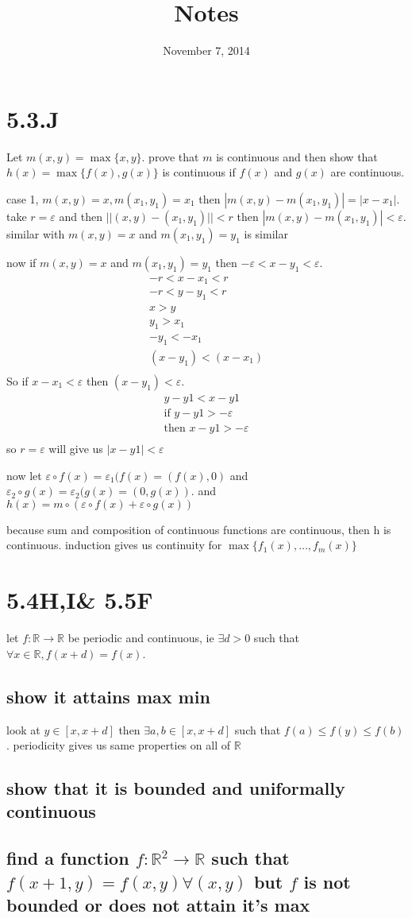 \documentclass[letterpaper]{article}
\begin{document}
\title{Notes}
\date{November 7, 2014}
\maketitle
\section*{5.3.J}
Let $m(x,y)=\max\{x,y\}$. prove that $m$ is continuous and then show that $h(x)=\max\{f(x),g(x)\}$ is continuous if $f(x)$ and $g(x)$ are continuous.

case 1, $m(x,y)=x,m(x_1,y_1)=x_1$ then $|m(x,y)-m(x_1,y_1)|=|x-x_1|$. take $r=\varepsilon$ and then $||(x,y)-(x_1,y_1)||<r$ then $|m(x,y)-m(x_1,y_1)|<\varepsilon$. similar with $m(x,y)=x$ and $m(x_1,y_1)=y_1$ is similar

now if $m(x,y)=x$ and $m(x_1,y_1)=y_1$ then $-\varepsilon<x-y_1<\varepsilon$.
\begin{align*}
  -r<x-x_1<r\\
  -r<y-y_1<r\\
  x>y\\
  y_1>x_1\\
  -y_1<-x_1\\
  (x-y_1)<(x-x_1)\\
\end{align*}
So if $x-x_1<\varepsilon$ then $(x-y_1)<\varepsilon$. 
\begin{align*}
  y-y1<x-y1\\
  \text{if }y-y1>-\varepsilon\\
  \text{then }x-y1>-\varepsilon\\
\end{align*}
so $r=\varepsilon$ will give us $|x-y1|<\varepsilon$

now let $\varepsilon\circ f(x)=\varepsilon_1(f(x)=(f(x),0)$ and $\varepsilon_2\circ g(x)=\varepsilon_2(g(x)=(0,g(x))$. and $h(x)=m\circ(\varepsilon\circ f(x)+\varepsilon\circ g(x))$

because sum and composition of continuous functions are continuous, then h is continuous. induction gives us continuity for $\max\{f_1(x),\dots,f_m(x)\}$

\section*{5.4H,I\& 5.5F}
let $f:\mathbb{R}\to\mathbb{R}$ be periodic and continuous, ie $\exists d>0$ such that $\forall x\in \mathbb{R}, f(x+d)=f(x)$.

\subsection*{show it attains max min}
look at $y\in[x,x+d]$ then $\exists a,b\in [x,x+d]$ such that $f(a)\le f(y)\le f(b)$. periodicity gives us same properties on all of $\mathbb{R}$
\subsection*{show that it is bounded and uniformally continuous}
\subsection*{find a function $f:\mathbb{R}^2\to \mathbb{R}$ such that $f(x+1,y)=f(x,y)\forall(x,y)$ but $f$ is not bounded or does not attain it's max}
\end{document}
